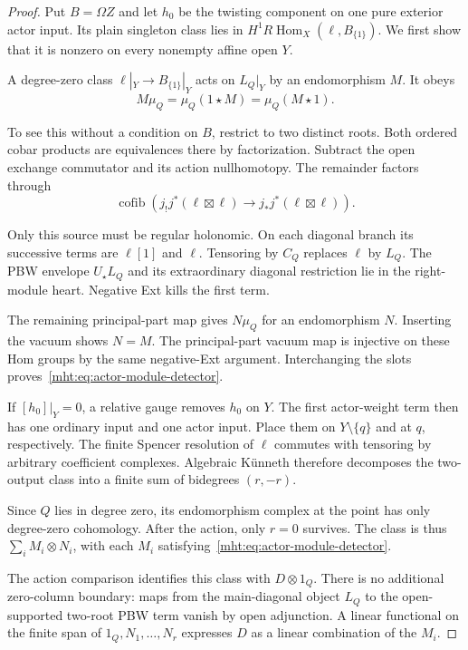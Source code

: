 \begin{proof}
Put $B=\Omega Z$ and let $h_0$ be the twisting
component on one pure exterior actor input. Its
plain singleton class lies in
$H^1R\operatorname{Hom}_X(\ell,B_{\{1\}})$.
We first show that it is nonzero on every nonempty
affine open $Y$.

A degree-zero class $\ell|_Y\to B_{\{1\}}|_Y$
acts on $L_Q|_Y$ by an endomorphism $M$. It obeys
\begin{equation}\label{mht:eq:actor-module-detector}
 M\mu_Q=\mu_Q(1\star M)=\mu_Q(M\star1).
\end{equation}

To see this without a condition on $B$, restrict
to two distinct roots. Both ordered cobar products
are equivalences there by factorization. Subtract
the open exchange commutator and its action
nullhomotopy. The remainder factors through
\[
 \operatorname{cofib}
   (j_!j^*(\ell\boxtimes\ell)
                     \longrightarrow j_*j^*(\ell\boxtimes\ell)).
\]

Only this source must be regular holonomic. On
each diagonal branch its successive terms are
$\ell[1]$ and $\ell$. Tensoring by $C_Q$ replaces
$\ell$ by $L_Q$. The PBW envelope $U_\star L_Q$
and its extraordinary diagonal restriction lie
in the right-module heart. Negative Ext kills
the first term. 

The remaining principal-part
map gives $N\mu_Q$ for an endomorphism $N$.
Inserting the vacuum shows $N=M$. The principal-part
vacuum map is injective on these Hom groups by
the same negative-Ext argument. Interchanging the
slots proves~\eqref{mht:eq:actor-module-detector}.

If $[h_0]|_Y=0$, a relative gauge removes $h_0$
on $Y$. The first actor-weight term then has
one ordinary input and one actor input. Place
them on $Y\setminus\{q\}$ and at $q$, respectively.
The finite Spencer resolution of $\ell$ commutes
with tensoring by arbitrary coefficient complexes.
Algebraic K\"unneth therefore decomposes the
two-output class into a finite sum of bidegrees
$(r,-r)$. 

Since $Q$ lies in degree zero, its
endomorphism complex at the point has only
degree-zero cohomology. After the action, only
$r=0$ survives. The class is thus
$\sum_i M_i\otimes N_i$, with each $M_i$
satisfying~\eqref{mht:eq:actor-module-detector}.

The action comparison identifies this class with
$D\otimes1_Q$. There is no additional zero-column
boundary: maps from the main-diagonal object
$L_Q$ to the open-supported two-root PBW term
vanish by open adjunction. A linear functional
on the finite span of $1_Q,N_1,\ldots,N_r$
expresses $D$ as a linear combination of the
$M_i$. 


\end{proof}
